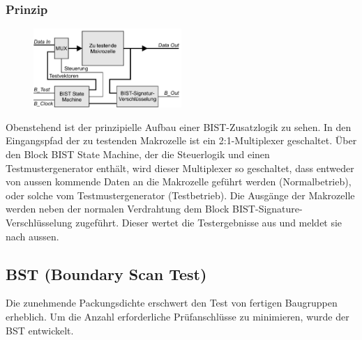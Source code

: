 \subsubsection{Prinzip}
\begin{multicols}{2}
\begin{figure}[H]
    \includegraphics[width=0.5\textwidth]{images/prinzip_bist.png}
\end{figure}
Obenstehend ist der prinzipielle Aufbau einer BIST-Zusatzlogik zu sehen. In den Eingangspfad der zu testenden Makrozelle ist ein 2:1-Multiplexer geschaltet. Über den Block BIST State Machine, der die Steuerlogik und einen Testmustergenerator enthält, wird dieser Multiplexer so geschaltet, dass entweder von aussen kommende Daten an die Makrozelle geführt werden (Normalbetrieb), oder solche vom
Testmustergenerator (Testbetrieb). Die Ausgänge der Makrozelle werden neben der normalen Verdrahtung dem Block BIST-Signature-Verschlüsselung zugeführt. Dieser wertet die Testergebnisse aus und meldet sie nach aussen.
\end{multicols}
\subsection{BST (Boundary Scan Test)}
Die zunehmende Packungsdichte erschwert den Test von fertigen Baugruppen erheblich. Um die Anzahl erforderliche Prüfanschlüsse zu minimieren, wurde der BST entwickelt.


